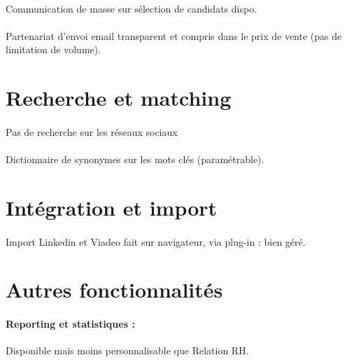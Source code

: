 \paragraph{} Communication de masse sur sélection de candidats dispo.
\paragraph{} Partenariat d'envoi email transparent et compris dans le prix de vente (pas de limitation de volume).


\section{Recherche et matching}
\paragraph{} Pas de recherche sur les réseaux sociaux
\paragraph{} Dictionnaire de synonymes sur les mots clés (paramétrable).


\section{Intégration et import}
\paragraph{} Import Linkedin et Viadeo fait sur navigateur, via plug-in : bien géré. 

\section{Autres fonctionnalités}

\paragraph{Reporting et statistiques :} Disponible mais moins personnalisable que Relation RH.


